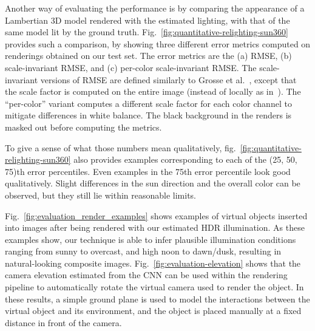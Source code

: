 Another way of evaluating the performance is by comparing the appearance of a Lambertian 3D model rendered with the estimated lighting, with that of the same model lit by the ground truth. Fig.~\ref{fig:quantitative-relighting-sun360} provides such a comparison, by showing three different error metrics computed on renderings obtained on our test set. The error metrics are the (a) RMSE, (b) scale-invariant RMSE, and (c) per-color scale-invariant RMSE. The scale-invariant versions of RMSE are defined similarly to Grosse et al.~\cite{grosse-iccv-09}, except that the scale factor is computed on the entire image (instead of locally as in~\cite{grosse-iccv-09}). The ``per-color'' variant computes a different scale factor for each color channel to mitigate differences in white balance. The black background in the renders is masked out before computing the metrics.
  
To give a sense of what those numbers mean qualitatively, fig.~\ref{fig:quantitative-relighting-sun360} also provides examples corresponding to each of the (25, 50, 75)th error percentiles. Even examples in the 75th error percentile look good qualitatively. Slight differences in the sun direction and the overall color can be observed, but they still lie within reasonable limits.

Fig.~\ref{fig:evaluation_render_examples} shows examples of virtual objects inserted into images after being rendered with our estimated HDR illumination. As these examples show, our technique is able to infer plausible illumination conditions ranging from sunny to overcast, and high noon to dawn/dusk, resulting in natural-looking composite images. Fig.~\ref{fig:evaluation-elevation} shows that the camera elevation estimated from the CNN can be used within the rendering pipeline to automatically rotate the virtual camera used to render the object. In these results, a simple ground plane is used to model the interactions between the virtual object and its environment, and the object is placed manually at a fixed distance in front of the camera.



